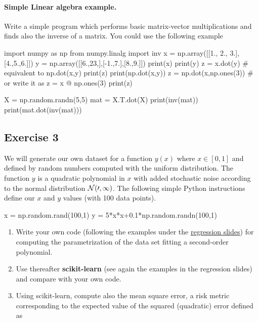 \documentclass[%
oneside,                 %
final,                   %
10pt]{article}
\begin{document}
\paragraph{Simple Linear algebra example.}
Write a simple program which performs basic matrix-vector multiplications and finds also the inverse of a matrix. You could use the following example
\begin{print}
import numpy as np
from numpy.linalg import inv
x = np.array([[1., 2., 3.],[4.,5.,6.]])
y = np.array([[6.,23,],[-1.,7.],[8.,9.]])
print(x)
print(y)
z = x.dot(y)
# equivalent to np.dot(x,y)
print(z)
print(np.dot(x,y))
z = np.dot(x,np.ones(3))
# or write it as 
z = x @ np.ones(3)
print(z)

X = np.random.randn(5,5)
mat = X.T.dot(X)
print(inv(mat))
print(mat.dot(inv(mat)))
\end{print}
\subsection*{Exercise 3}

We will generate our own dataset for a function $y(x)$ where $x \in [0,1]$ and defined by random numbers computed with the uniform distribution. The function $y$ is a quadratic polynomial in $x$ with added stochastic noise according to the normal distribution $\cal {N}(0,1)$.
The following simple Python instructions define our $x$ and $y$ values (with 100 data points).
\begin{print}
x = np.random.rand(100,1)
y = 5*x*x+0.1*np.random.randn(100,1)
\end{print}

\begin{enumerate}
\item Write your own code (following the examples under the \href{{https://compphysics.github.io/MachineLearning/doc/pub/Regression/html/Regression-bs.html}}{regression slides}) for computing the parametrization of the data set fitting a second-order polynomial. 

\item Use thereafter \textbf{scikit-learn} (see again the examples in the regression slides) and compare with your own code.   

\item Using scikit-learn, compute also the mean square error, a risk metric corresponding to the expected value of the squared (quadratic) error defined as
\end{enumerate}
\end{document}
